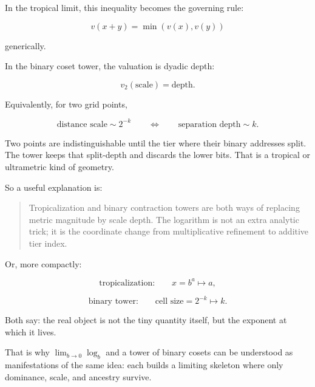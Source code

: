 \documentclass[11pt]{article}
\begin{document}
In the tropical limit, this inequality becomes the governing rule:

\[
v(x+y) = \min(v(x),v(y))
\]

generically.

In the binary coset tower, the valuation is dyadic depth:

\[
v_2(\text{scale}) = \text{depth}.
\]

Equivalently, for two grid points,

\[
\text{distance scale} \sim 2^{-k}
\qquad\Longleftrightarrow\qquad
\text{separation depth} \sim k.
\]

Two points are indistinguishable until the tier where their binary addresses
split. The tower keeps that split-depth and discards the lower bits. That is a
tropical or ultrametric kind of geometry.

So a useful explanation is:

\begin{quote}
Tropicalization and binary contraction towers are both ways of replacing metric
magnitude by scale depth. The logarithm is not an extra analytic trick; it is
the coordinate change from multiplicative refinement to additive tier index.
\end{quote}

Or, more compactly:

\[
\text{tropicalization:}\qquad x=b^a \longmapsto a,
\]

\[
\text{binary tower:}\qquad \text{cell size}=2^{-k} \longmapsto k.
\]

Both say: the real object is not the tiny quantity itself, but the exponent at
which it lives.

That is why \(\lim_{b\to 0}\log_b\) and a tower of binary cosets can be
understood as manifestations of the same idea: each builds a limiting skeleton
where only dominance, scale, and ancestry survive.







\end{document}
